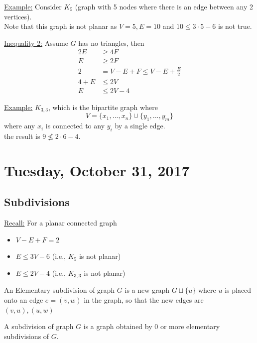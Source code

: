 \documentclass[12pt]{article}
\begin{document}
\underline{Example:} Consider $K_5$ (graph with 5 nodes where there is an edge between any 2 vertices).\\
Note that this graph is not planar as $V=5, E=10$ and $10 \leq 3\cdot 5 - 6$ is not true.

\begin{tcolorbox}
	\underline{Inequality 2:} Assume $G$ has no triangles, then
	\begin{align*}
		2E &\geq 4F\\
		E &\geq 2F\\
		2 &= V-E+F \leq V-E+\frac{E}{2}\\
		4+E &\leq 2V\\
		E &\leq 2V - 4
	\end{align*}
\end{tcolorbox}

\underline{Example:} $K_{3,3}$, which is the bipartite graph where 
$$V = \{ x_1, ..., x_n \} \cup \{ y_1, ..., y_m \}$$
where any $x_i$ is connected to any $y_i$ by a single edge.\\

the result is $9 \not\leq 2\cdot 6 - 4$.

\section{Tuesday, October 31, 2017}

\subsection{Subdivisions}

\begin{tcolorbox}
	\underline{Recall:} For a planar connected graph
	\begin{itemize}
		\item{$V-E+F = 2$}
		\item{$E \leq 3V - 6$ (i.e., $K_5$ is not planar)}
		\item{$E \leq 2V - 4$ (i.e., $K_{3,3}$ is not planar)}
	\end{itemize}
\end{tcolorbox}

\begin{tcolorbox}[title=Definition: Elementary Subdivision of a graph $G$]
	An Elementary subdivision of graph $G$ is a new graph $G \sqcup \{ u \}$ where $u$ is placed onto an edge $e=(v,w)$ in the graph, so that the new edges are $(v,u), (u,w)$
\end{tcolorbox}
\begin{tcolorbox}[title=Definition: Subdivision of a graph $G$]
	A subdivision of graph $G$ is a graph obtained by 0 or more elementary subdivisions of $G$.
\end{tcolorbox}
\end{document}
